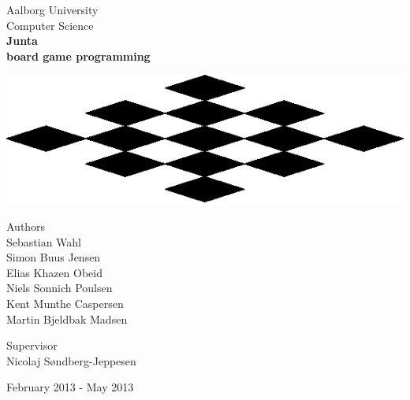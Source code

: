 \begin{titlingpage}
\begin{center}

\vspace*{0.5cm}

\LARGE Aalborg University\\[0.75cm]
\Large Computer Science\\[1.5cm]


{ \fontsize{80.2pt}{80.2pt} \bfseries {} Junta \\}
\vspace{0.15cm}
{ \fontsize{35.2pt}{35.2pt} \bfseries {} board game programming}

\vspace{1.0cm}

\includegraphics[scale=1.5]{pictures/fakelogo}


\begin{minipage}{13.37cm}
  \begin{flushleft} \large
    \vspace{0pt}
    {\small Authors } \\
    \vspace{0.5cm}
    Sebastian Wahl\\
    Simon Buus Jensen\\
    Elias Khazen Obeid\\
    Niels Sonnich Poulsen\\
    Kent Munthe Caspersen\\
    Martin Bjeldbak Madsen\\
  \end{flushleft}

  \begin{flushright} \large
    \vspace{-120pt}
    {\small Supervisor}\\
    \vspace{0.5cm}
    Nicolaj Søndberg-Jeppesen
  \end{flushright}
\end{minipage}

\vfill

{\large February 2013 - May 2013}
\end{center}
\end{titlingpage}
